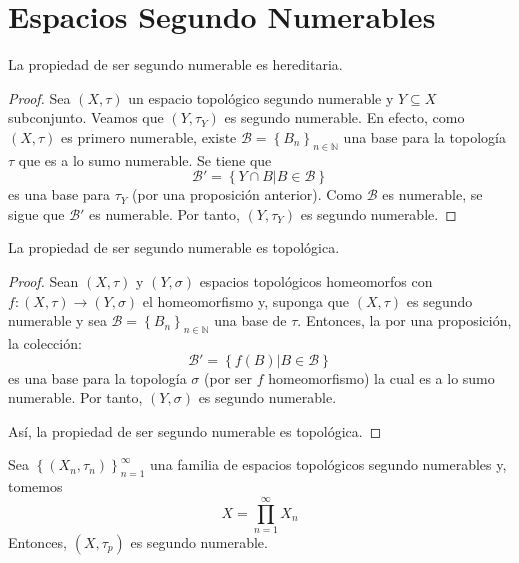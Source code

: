 \documentclass[12pt]{report}
\theoremstyle{largebreak}
\newcommand\cf[3]{\ensuremath{#1:#2\rightarrow#3}}
\begin{document}
    \section{Espacios Segundo Numerables}

    \begin{propo}
        La propiedad de ser segundo numerable es hereditaria.
    \end{propo}

    \begin{proof}
        Sea $(X,\tau)$ un espacio topológico segundo numerable y $Y\subseteq X$ subconjunto. Veamos que $(Y,\tau_Y)$ es segundo numerable. En efecto, como $(X,\tau)$ es primero numerable, existe $\mathcal{B}=\left\{B_n\right\}_{ n\in\mathbb{N}}$ una base para la topología $\tau$ que es a lo sumo numerable. Se tiene que
        \begin{equation*}
            \mathcal{B}'=\left\{Y\cap B\Big|B\in\mathcal{B} \right\}
        \end{equation*}
        es una base para $\tau_Y$ (por una proposición anterior). Como $\mathcal{B}$ es numerable, se sigue que $\mathcal{B}'$ es numerable. Por tanto, $(Y,\tau_Y)$ es segundo numerable.
    \end{proof}

    \begin{propo}
        La propiedad de ser segundo numerable es topológica.
    \end{propo}

    \begin{proof}
        Sean $(X,\tau)$ y $(Y,\sigma)$ espacios topológicos homeomorfos con $\cf{f}{(X,\tau)}{(Y,\sigma)}$ el homeomorfismo y, suponga que $(X,\tau)$ es segundo numerable y sea $\mathcal{B}=\left\{B_n \right\}_{ n\in\mathbb{N}}$ una base de $\tau$. Entonces, la por una proposición, la colección:
        \begin{equation*}
            \mathcal{B}'=\left\{f(B)\Big|B\in\mathcal{B} \right\}
        \end{equation*}
        es una base para la topología $\sigma$ (por ser $f$ homeomorfismo) la cual es a lo sumo numerable. Por tanto, $(Y,\sigma)$ es segundo numerable.

        Así, la propiedad de ser segundo numerable es topológica.
    \end{proof}

    \begin{excer}
        Sea $\left\{(X_n,\tau_n) \right\}_{ n=1}^\infty$ una familia de espacios topológicos segundo numerables y, tomemos
        \begin{equation*}
            X=\prod_{ n=1}^\infty X_n
        \end{equation*}
        Entonces, $(X,\tau_p)$ es segundo numerable.
    \end{excer}
\end{document}

